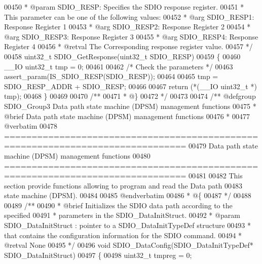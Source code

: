 \begin{DoxyCode}
00450 \textcolor{comment}{  * @param  SDIO\_RESP: Specifies the SDIO response register. }
00451 \textcolor{comment}{  *          This parameter can be one of the following values:}
00452 \textcolor{comment}{  *            @arg SDIO\_RESP1: Response Register 1}
00453 \textcolor{comment}{  *            @arg SDIO\_RESP2: Response Register 2}
00454 \textcolor{comment}{  *            @arg SDIO\_RESP3: Response Register 3}
00455 \textcolor{comment}{  *            @arg SDIO\_RESP4: Response Register 4}
00456 \textcolor{comment}{  * @retval The Corresponding response register value.}
00457 \textcolor{comment}{  */}
00458 uint32\_t SDIO_GetResponse(uint32\_t SDIO\_RESP)
00459 \{
00460   \_\_IO uint32\_t tmp = 0;
00461 
00462   \textcolor{comment}{/* Check the parameters */}
00463   assert_param(IS\_SDIO\_RESP(SDIO\_RESP));
00464 
00465   tmp = SDIO_RESP_ADDR + SDIO\_RESP;
00466 
00467   \textcolor{keywordflow}{return} (*(\_\_IO uint32\_t *) tmp);
00468 \}
00469 
00470 \textcolor{comment}{/**}
00471 \textcolor{comment}{  * @\}}
00472 \textcolor{comment}{  */}
00473 
00474 \textcolor{comment}{/** @defgroup SDIO\_Group3 Data path state machine (DPSM) management functions}
00475 \textcolor{comment}{ *  @brief   Data path state machine (DPSM) management functions}
00476 \textcolor{comment}{ *}
00477 \textcolor{comment}{@verbatim   }
00478 \textcolor{comment}{ ===============================================================================}
00479 \textcolor{comment}{              Data path state machine (DPSM) management functions}
00480 \textcolor{comment}{ ===============================================================================  }
00481 \textcolor{comment}{}
00482 \textcolor{comment}{  This section provide functions allowing to program and read the Data path }
00483 \textcolor{comment}{  state machine (DPSM).}
00484 \textcolor{comment}{}
00485 \textcolor{comment}{@endverbatim}
00486 \textcolor{comment}{  * @\{}
00487 \textcolor{comment}{  */}
00488 
00489 \textcolor{comment}{/**}
00490 \textcolor{comment}{  * @brief  Initializes the SDIO data path according to the specified }
00491 \textcolor{comment}{  *         parameters in the SDIO\_DataInitStruct.}
00492 \textcolor{comment}{  * @param  SDIO\_DataInitStruct : pointer to a SDIO\_DataInitTypeDef structure }
00493 \textcolor{comment}{  *         that contains the configuration information for the SDIO command.}
00494 \textcolor{comment}{  * @retval None}
00495 \textcolor{comment}{  */}
00496 \textcolor{keywordtype}{void} SDIO_DataConfig(SDIO\_DataInitTypeDef* SDIO\_DataInitStruct)
00497 \{
00498   uint32\_t tmpreg = 0;

\end{DoxyCode}
